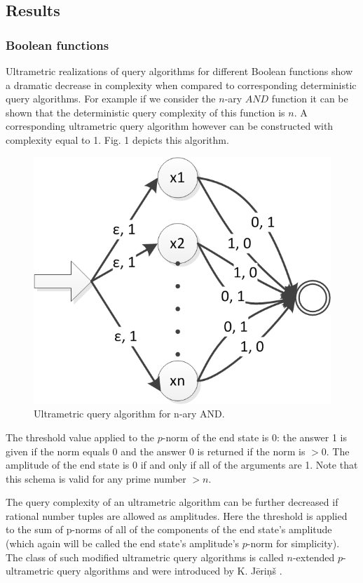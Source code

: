 \documentclass{llncs}
\begin{document}
\subsection{Results}
\subsubsection{Boolean functions}
Ultrametric realizations of query algorithms for different Boolean functions show a dramatic decrease in complexity when compared to corresponding deterministic query algorithms. For example if we consider the $n$-ary $AND$ function it can be shown that the deterministic query complexity of this function is $n$. A corresponding ultrametric query algorithm however can be constructed with complexity equal to 1. Fig. 1 depicts this algorithm.

\begin{figure}
	\centering
	\includegraphics{n-and.png}
	\caption{Ultrametric query algorithm for n-ary AND.}
	  \label{n_and}
\end{figure}

The threshold value applied to the $p$-norm of the end state is 0: the answer 1 is given if the norm equals 0 and the answer 0 is returned if the norm is $>0$. The amplitude of the end state is 0 if and only if all of the arguments are 1. Note that this schema is valid for any prime number $>n$. 

The query complexity of an ultrametric algorithm can be further decreased if rational number tuples are allowed as amplitudes. Here the threshold is applied to the sum of p-norms of all of the components of the end state's amplitude (which again will be called the end state's amplitude's $p$-norm for simplicity). The class of such modified ultrametric query algorithms is called $n$-extended $p$-ultrametric query algorithms and were introduced by K. J\= eri\c n\v s \cite{Jer12}.
\end{document}

